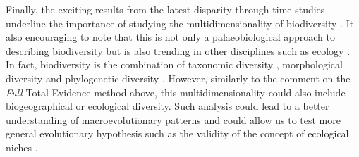 Finally, the exciting results from the latest disparity through time studies underline the importance of studying the multidimensionality of biodiversity \citep[cf. just taxonomic richness;][]{Butler2012,brusattedinosaur2012,toljagictriassic-jurassic2013,brusattegradual2014,bensonfaunal2014,Claddis,Close2015}.
It also encouraging to note that this is not only a palaeobiological approach to describing biodiversity but is also trending in other disciplines such as ecology \citep{DonohueDim}.
In fact, biodiversity is the combination of taxonomic diversity \citep[e.g.][]{Stadler12042011}, morphological diversity \citep[from cladistics or morphometrics;][]{hetherington2015cladistic} and phylogenetic diversity \citep[e.g. the evolutionary rates regimes;][]{Close2015}. %
However, similarly to the comment on the \textit{Full} Total Evidence method above, this multidimensionality could also include biogeographical or ecological diversity.
Such analysis could lead to a better understanding of macroevolutionary patterns and could allow us to test more general evolutionary hypothesis such as the validity of the concept of ecological niches \citep{pearmanniche2008}. %

